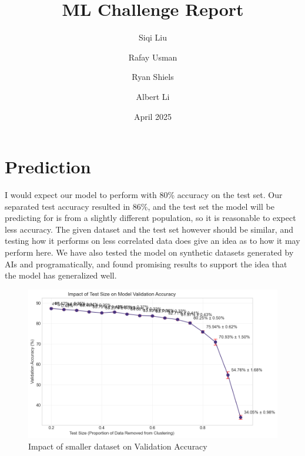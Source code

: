\documentclass[journal]{IEEEtran}
\title{ML Challenge Report}
\author{
  Siqi Liu
  \and
  Rafay Usman
  \and
  Ryan Shiels
  \and
  Albert Li
}
\date{April 2025}
\begin{document}
\maketitle







\section{Prediction}
I would expect our model to perform with 80\% accuracy on the test set. Our separated test accuracy resulted in 86\%, and the test set the model will be predicting for is from a slightly different population, so it is reasonable to expect less accuracy.
The given dataset and the test set however should be similar, and testing how it performs on less correlated data does give an idea as to how it may perform here. We have also tested the model on synthetic datasets generated by AIs and programatically, and found promising results to support the idea that the model has generalized well.

\begin{figure}[h]
  \centerline{\includegraphics[width=\columnwidth]{TestSize.png}}
  \caption{Impact of smaller dataset on Validation Accuracy}
  \label{f:testsize_diagram}
\end{figure}
\end{document}
